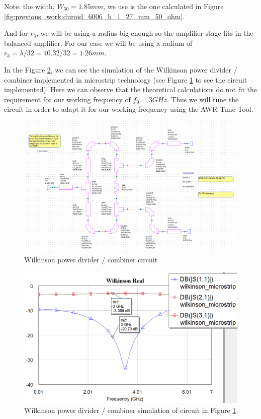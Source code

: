 \documentclass[12pt]{report} %
\begin{document}
Note: the width, $W_{50} = 1.85 mm$, we use is the one calculated in Figure \ref{fig:previous_work:duroid_6006_h_1_27_mm_50_ohm}.

And for $r_3$, we will be using a radius big enough so the amplifier stage fits in the balanced amplifier. For our case we will be using a radium of $r_3 = \lambda / 32 = 40.32 / 32 = 1.26 mm$.

In the Figure \ref{fig:microstrip_elements:wilkinson_microstrip_graph}, we can see the simulation of the Wilkinson power divider / combiner implemented in microstrip technology (see Figure \ref{fig:microstrip_elements:wilkinson_microstrip_circuit} to see the circuit implemented). Here we can observe that the theoretical calculations do not fit the requirement for our working frequency of $f_0 = 3 GHz$. Thus we will tune the circuit in order to adapt it for our working frequency using the AWR Tune Tool.

\begin{figure}[htbp]
    \centering
    \includegraphics[width=1\linewidth]{images//microstrip_elements/wilkinson_microstrip_circuit.png}
    \caption{Wilkinson power divider / combiner circuit}
    \label{fig:microstrip_elements:wilkinson_microstrip_circuit}
\end{figure}

\begin{figure}[htbp]
    \centering
    \includegraphics[width=1\linewidth]{images//microstrip_elements/wilkinson_microstrip_graph.png}
    \caption{Wilkinson power divider / combiner simulation of circuit in Figure \ref{fig:microstrip_elements:wilkinson_microstrip_circuit}}
    \label{fig:microstrip_elements:wilkinson_microstrip_graph}
\end{figure}
\end{document}
